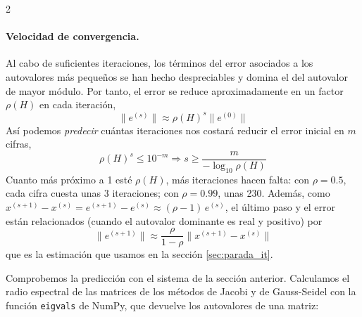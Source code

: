 \begin{paracol}{2}
\paragraph{Velocidad de convergencia.} Al cabo de suficientes iteraciones, los términos del error asociados a los autovalores más pequeños se han hecho despreciables y domina el del autovalor de mayor módulo. Por tanto, el error se reduce aproximadamente en un factor $\rho(H)$ en cada iteración,
\begin{equation*}
\lVert e^{(s)}\rVert \approx  \rho(H)^s \lVert e^{(0)}\rVert
\end{equation*}
Así podemos \emph{predecir} cuántas iteraciones nos costará reducir el error inicial en $m$ cifras,
\begin{equation*}
\rho(H)^s \leq 10^{-m} \Rightarrow s \geq \frac{m}{-\log_{10}\rho(H)}
\end{equation*}
Cuanto más próximo a 1 esté $\rho(H)$, más iteraciones hacen falta: con $\rho=0.5$, cada cifra cuesta unas 3 iteraciones; con $\rho=0.99$, unas 230. Además, como $x^{(s+1)}-x^{(s)}=e^{(s+1)}-e^{(s)}\approx(\rho-1)\,e^{(s)}$, el último paso y el error están relacionados (cuando el autovalor dominante es real y positivo) por
\begin{equation*}
\lVert e^{(s+1)}\rVert\approx\frac{\rho}{1-\rho}\lVert x^{(s+1)}-x^{(s)}\rVert
\end{equation*}
que es la estimación que usamos en la sección \ref{sec:parada_it}.

Comprobemos la predicción con el sistema de la sección anterior. Calculamos el radio espectral de las matrices de los métodos de Jacobi y de Gauss-Seidel con la función \texttt{eigvals} de NumPy, que devuelve los autovalores de una matriz:

\switchcolumn

\end{paracol}
